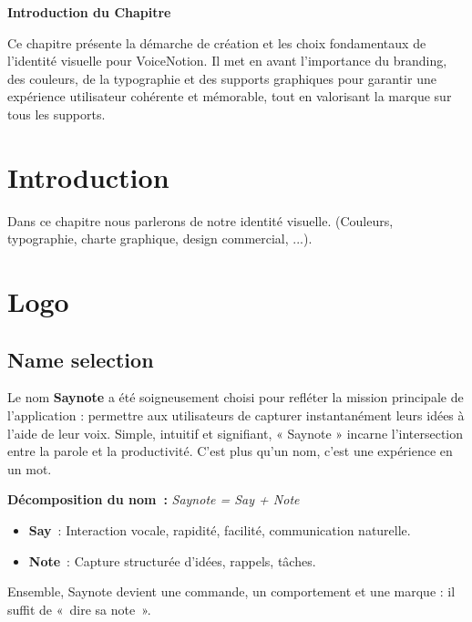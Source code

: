 
\begin{center}
\textbf{\large Introduction du Chapitre}
\end{center}

\noindent
Ce chapitre présente la démarche de création et les choix fondamentaux de l'identité visuelle pour VoiceNotion. Il met en avant l'importance du branding, des couleurs, de la typographie et des supports graphiques pour garantir une expérience utilisateur cohérente et mémorable, tout en valorisant la marque sur tous les supports.

\section{Introduction}
Dans ce chapitre nous parlerons de notre identité visuelle. (Couleurs, typographie, charte graphique, design commercial, ...).

\section{Logo}
\subsection{Name selection}
\begin{tcolorbox}[colback=voicenotionLightGray!10!white, title=Origine du nom]
Le nom \textbf{Saynote} a été soigneusement choisi pour refléter la mission principale de l'application : permettre aux utilisateurs de capturer instantanément leurs idées à l’aide de leur voix. Simple, intuitif et signifiant, « Saynote » incarne l’intersection entre la parole et la productivité. C’est plus qu’un nom, c’est une expérience en un mot.
\end{tcolorbox}

\textbf{Décomposition du nom~:} \textit{Saynote = Say + Note}
\begin{itemize}
    \item \textbf{Say}~: Interaction vocale, rapidité, facilité, communication naturelle.
    \item \textbf{Note}~: Capture structurée d’idées, rappels, tâches.
\end{itemize}

\noindent
Ensemble, Saynote devient une commande, un comportement et une marque : il suffit de «~dire sa note~».

